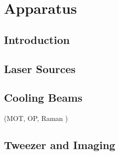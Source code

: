 
\chapter{Apparatus}
\label{ch:apparatus}

\section{Introduction}
\label{ch:apparatus:introduction}


\section{Laser Sources}
\label{ch:apparatus:laser}

\section{Cooling Beams}
\label{ch:apparatus:cooling}

(MOT, OP, Raman )

\section{Tweezer and Imaging}
\label{ch:apparatus:tweezer}
